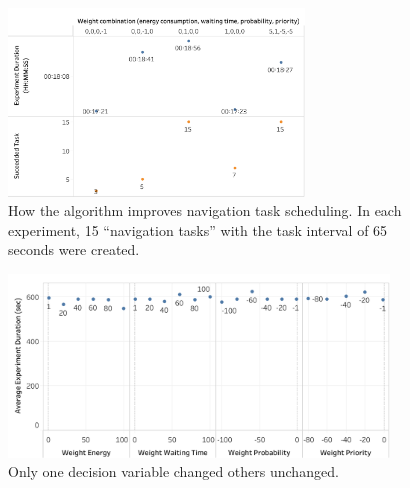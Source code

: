 \begin{figure}
   \centering
   \includegraphics[width = 0.7\textwidth]{content/images/ch5/improvement_evaluation_65s.png}
   \caption{How the algorithm improves navigation task scheduling. In each experiment, 15 ``navigation tasks'' with the task interval of 65 seconds were created.}
   \label{fig:improvement_evaluation}
  \end{figure}

\begin{figure}
   \centering
   \includegraphics[width = 0.9\textwidth]{content/images/ch5/one_decision_variable.png}
   \caption{Only one decision variable changed others unchanged.}
   \label{fig:only_one_decision_variable_changed}
  \end{figure}



